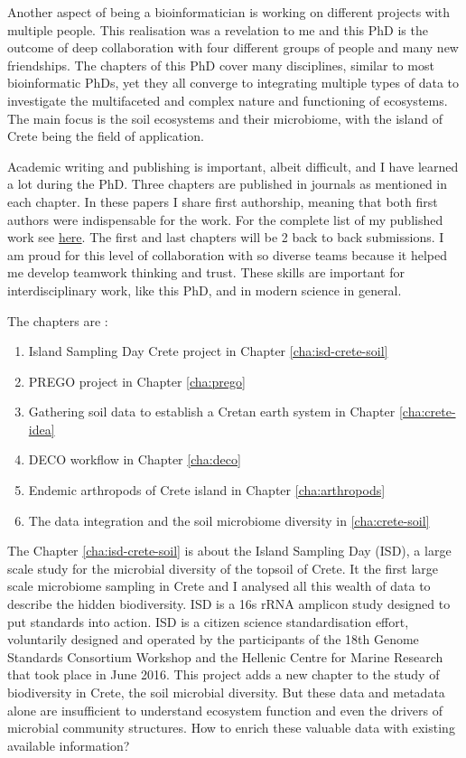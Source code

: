\documentclass[
11pt, %
english, %
singlespacing, %
liststotoc, %
toctotoc, %
headsepline, %
]{MastersDoctoralThesis} %
\begin{document}
Another aspect of being a bioinformatician is working on different projects with 
multiple people. This realisation was a revelation to me and this PhD is the outcome 
of deep collaboration with four different groups of people and many new friendships. 
The chapters of this PhD cover many disciplines, similar to most bioinformatic PhDs,
yet they all converge to integrating multiple types of data to investigate the multifaceted
and complex nature and functioning of ecosystems. The main focus is the soil ecosystems and 
their microbiome, with the island of Crete being the field of application.

Academic writing and publishing is important, albeit difficult, and I have learned a
lot during the PhD. Three chapters are published in journals as
mentioned in each chapter. In these papers I share first authorship, meaning that 
both first authors were indispensable for the work. For the complete list of my published work see \hyperref[cv:my_refs]{here}.
The first and last chapters will be 2 back to back submissions. I am proud for this level of collaboration
with so diverse teams because it helped me develop teamwork thinking and trust. These skills are important 
for interdisciplinary work, like this PhD, and in modern science in general.

The chapters are :

\begin{enumerate}
    \item Island Sampling Day Crete project in Chapter \ref{cha:isd-crete-soil}
    \item PREGO project in Chapter \ref{cha:prego}
    \item Gathering soil data to establish a Cretan earth system in Chapter \ref{cha:crete-idea}
    \item DECO workflow in Chapter \ref{cha:deco}
    \item Endemic arthropods of Crete island in Chapter \ref{cha:arthropods}
    \item The data integration and the soil microbiome diversity in \ref{cha:crete-soil}
\end{enumerate}

The Chapter \ref{cha:isd-crete-soil} is about the Island Sampling Day (ISD), a large scale study for the microbial diversity of the
topsoil of Crete. It the first large scale microbiome sampling in Crete and I analysed
all this wealth of data to describe the hidden biodiversity.
ISD is a 16s rRNA amplicon study designed to put standards into action. 
ISD is a citizen science standardisation effort, voluntarily designed and
operated by the participants of the 18th Genome Standards Consortium
Workshop and the Hellenic Centre for Marine Research that took place in June 2016.
This project adds a new chapter to the study of biodiversity in Crete,
the soil microbial diversity. But these data and metadata alone are 
insufficient to understand ecosystem function and even the drivers 
of microbial community structures. How to enrich these valuable data 
with existing available information? 
\end{document}
